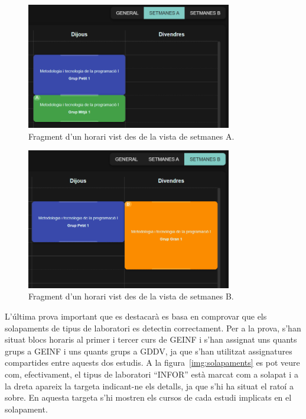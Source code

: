 \documentclass[a4paper,12pt]{ThesisStyle}
\begin{document}
\begin{figure}[H]
  \centering
  \includegraphics[width=0.8\textwidth]{assets/proves/setA.png}
  \caption{\label{img:setA} Fragment d'un horari vist des de la vista de setmanes A.}
\end{figure}

\begin{figure}[H]
  \centering
  \includegraphics[width=0.8\textwidth]{assets/proves/setB.png}
  \caption{\label{img:setB} Fragment d'un horari vist des de la vista de setmanes B.}
\end{figure}

L'última prova important que es destacarà es basa en comprovar que els solapaments de tipus de laboratori es detectin correctament. Per a la prova, s'han situat blocs horaris al primer i tercer curs de GEINF i s'han assignat uns quants grups a GEINF i uns quants grups a GDDV, ja que s'han utilitzat assignatures compartides entre aquests dos estudis. A la figura~\ref{img:solapaments} es pot veure com, efectivament, el tipus de laboratori ``INFOR'' està marcat com a solapat i a la dreta apareix la targeta indicant-ne els detalls, ja que s'hi ha situat el ratoí a sobre. En aquesta targeta s'hi mostren els cursos de cada estudi implicats en el solapament.
\end{document}
